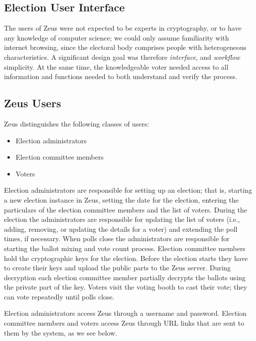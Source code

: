 \documentclass[letterpaper,10pt]{article}
\begin{document}
\subsection{Election User Interface}

The users of Zeus were not expected to be experts in cryptography, or
to have any knowledge of computer science; we could only assume
familiarity with internet browsing, since the electoral body comprises
people with heterogeneous characteristics. A significant design goal
was therefore \emph{interface}, and \emph{workflow} simplicity. At the
same time, the knowledgeable voter needed access to all information
and functions needed to both understand and verify the process.

\subsection{Zeus Users}

Zeus distinguishes the following classes of users:

\begin{itemize}
\item Election administrators
\item Election committee members
\item Voters
\end{itemize}

Election administrators are responsible for setting up an election;
that is, starting a new election instance in Zeus, setting the date
for the election, entering the particulars of the election committee
members and the list of voters. During the election the administrators
are responsible for updating the list of voters (i.e., adding,
removing, or updating the details for a voter) and extending the poll
times, if necessary. When polls close the administrators are
responsible for starting the ballot mixing and vote count process.
Election committee members hold the cryptographic keys for the
election. Before the election starts they have to create their keys
and upload the public parts to the Zeus server. During decryption each
election committee member partially decrypts the ballots using the
private part of the key. Voters visit the voting booth to cast their
vote; they can vote repeatedly until polls close.

Election administrators access Zeus through a username and password.
Election committee members and voters access Zeus through URL links
that are sent to them by the system, as we see below.
\end{document}
